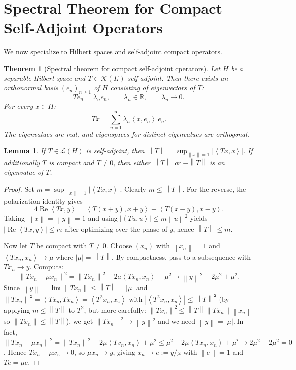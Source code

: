 \documentclass[a4paper,12pt]{book}
\newcommand{\R}{\mathbb{R}}
\newcommand{\norm}[1]{\left\| #1 \right\|}
\newcommand{\abs}[1]{\left| #1 \right|}
\newcommand{\inner}[2]{\left\langle #1, #2 \right\rangle}
\theoremstyle{definition}
\theoremstyle{plain}
\newtheorem{theorem}[definition]{Theorem}
\newtheorem{lemma}[definition]{Lemma}
\theoremstyle{remark}
\begin{document}

\section{Spectral Theorem for Compact Self-Adjoint Operators}
\label{sec:compact-sa-spectral}


We now specialize to Hilbert spaces and self-adjoint compact operators.

\begin{theorem}[Spectral theorem for compact self-adjoint operators]
\label{thm:compact-sa-spectral}
Let $H$ be a separable Hilbert space and $T \in \mathcal{K}(H)$ self-adjoint.
Then there exists an orthonormal basis $(e_n)_{n \ge 1}$ of $H$ consisting of
eigenvectors of $T$:
\[
  Te_n = \lambda_n e_n, \qquad \lambda_n \in \R, \qquad \lambda_n \to 0.
\]
For every $x \in H$:
\[
  Tx = \sum_{n=1}^\infty \lambda_n \inner{x}{e_n}\, e_n.
\]
The eigenvalues are real, and eigenspaces for distinct eigenvalues are orthogonal.
\end{theorem}

\begin{lemma}\label{lem:sa-norm-eigenvalue}
If $T \in \mathcal{L}(H)$ is self-adjoint, then
$\norm{T} = \sup_{\norm{x}=1} \abs{\inner{Tx}{x}}$.
If additionally $T$ is compact and $T \ne 0$, then either $\norm{T}$ or $-\norm{T}$
is an eigenvalue of $T$.
\end{lemma}

\begin{proof}
Set $m = \sup_{\norm{x}=1} \abs{\inner{Tx}{x}}$. Clearly $m \le \norm{T}$.
For the reverse, the polarization identity gives
\[
  4\operatorname{Re}\inner{Tx}{y} = \inner{T(x+y)}{x+y} - \inner{T(x-y)}{x-y}.
\]
Taking $\norm{x} = \norm{y} = 1$ and using $\abs{\inner{Tu}{u}} \le m\norm{u}^2$
yields $\abs{\operatorname{Re}\inner{Tx}{y}} \le m$ after optimizing over the
phase of $y$, hence $\norm{T} \le m$.

Now let $T$ be compact with $T \ne 0$. Choose $(x_n)$ with $\norm{x_n} = 1$ and
$\inner{Tx_n}{x_n} \to \mu$ where $\abs{\mu} = \norm{T}$. By compactness, pass
to a subsequence with $Tx_n \to y$. Compute:
\[
  \norm{Tx_n - \mu x_n}^2 = \norm{Tx_n}^2 - 2\mu\inner{Tx_n}{x_n} + \mu^2
  \to \norm{y}^2 - 2\mu^2 + \mu^2.
\]
Since $\norm{y} = \lim\norm{Tx_n} \le \norm{T} = \abs{\mu}$ and
$\norm{Tx_n}^2 = \inner{Tx_n}{Tx_n} = \inner{T^2 x_n}{x_n}$ with
$\abs{\inner{T^2 x_n}{x_n}} \le \norm{T}^2$ (by applying $m \le \norm{T}$ to
$T^2$, but more carefully:
$\norm{Tx_n}^2 \le \norm{T}\norm{Tx_n}\norm{x_n}$ so $\norm{Tx_n} \le \norm{T}$),
we get $\norm{Tx_n}^2 \to \norm{y}^2$ and we need $\norm{y} = \abs{\mu}$.
In fact, $\norm{Tx_n - \mu x_n}^2 = \norm{Tx_n}^2 - 2\mu\inner{Tx_n}{x_n} + \mu^2
\le \mu^2 - 2\mu\inner{Tx_n}{x_n} + \mu^2 \to 2\mu^2 - 2\mu^2 = 0$.
Hence $Tx_n - \mu x_n \to 0$, so $\mu x_n \to y$, giving
$x_n \to e := y/\mu$ with $\norm{e} = 1$ and $Te = \mu e$.
\end{proof}
\end{document}
